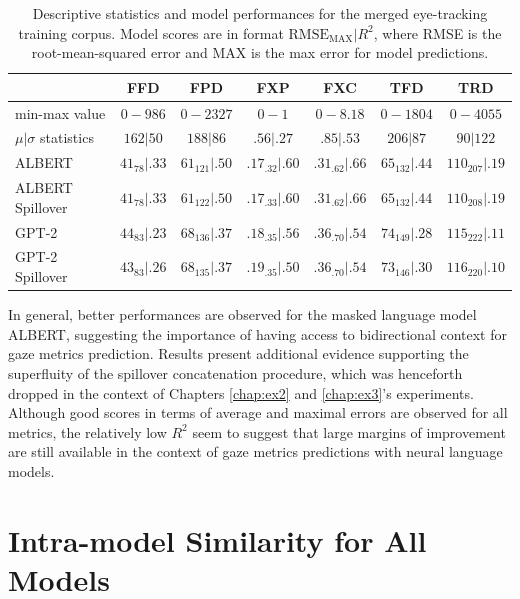 \documentclass[a4paper, nobind]{templates/ociamthesis}
\begin{document}
\begin{table}[!h]

\caption{\label{tab:multitask-et-scores}Descriptive statistics and model performances for the merged eye-tracking training corpus. Model scores are in format $\text{RMSE}_{\text{MAX}}|R^2$, where RMSE is the root-mean-squared error and MAX is the max error for model predictions.}
\centering
\fontsize{11}{13}\selectfont
\begin{tabular}[t]{lcccccc}
\toprule
\textbf{} & \textbf{FFD} & \textbf{FPD} & \textbf{FXP} & \textbf{FXC} & \textbf{TFD} & \textbf{TRD}\\
\midrule
min-max value & $0-986$ & $0-2327$ & $0-1$ & $0-8.18$ & $0-1804$ & $0-4055$\\
$\mu|\sigma$ statistics & $162|50$ & $188|86$ & $.56|.27$ & $.85|.53$ & $206|87$ & $90|122$\\
\hline
ALBERT & $41_{78}|.33$ & $61_{121}|.50$ & $.17_{.32}|.60$ & $.31_{.62}|.66$ & $65_{132}|.44$ & $110_{207}|.19$\\
ALBERT Spillover & $41_{78}|.33$ & $61_{122}|.50$ & $.17_{.33}|.60$ & $.31_{.62}|.66$ & $65_{132}|.44$ & $110_{208}|.19$\\
\hline
GPT-2 & $44_{83}|.23$ & $68_{136}|.37$ & $.18_{.35}|.56$ & $.36_{.70}|.54$ & $74_{149}|.28$ & $115_{222}|.11$\\
GPT-2 Spillover & $43_{83}|.26$ & $68_{135}|.37$ & $.19_{.35}|.50$ & $.36_{.70}|.54$ & $73_{146}|.30$ & $116_{220}|.10$\\
\bottomrule
\end{tabular}
\end{table}

In general, better performances are observed for the masked language model ALBERT, suggesting the importance of having access to bidirectional context for gaze metrics prediction. Results present additional evidence supporting the superfluity of the spillover concatenation procedure, which was henceforth dropped in the context of Chapters \ref{chap:ex2} and \ref{chap:ex3}'s experiments. Although good scores in terms of average and maximal errors are observed for all metrics, the relatively low \(R^2\) seem to suggest that large margins of improvement are still available in the context of gaze metrics predictions with neural language models.

\hypertarget{app:intra-sim}{%
\chapter{Intra-model Similarity for All Models}\label{app:intra-sim}}
\end{document}
